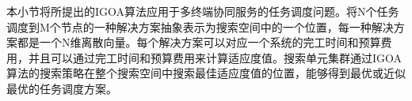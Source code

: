 
本小节将所提出的IGOA算法应用于多终端协同服务的任务调度问题。将N个任务调度到M个节点的一种解决方案抽象表示为搜索空间中的一个位置，每一种解决方案都是一个N维离散向量。每个解决方案可以对应一个系统的完工时间和预算费用，并且可以通过完工时间和预算费用来计算适应度值。搜索单元集群通过IGOA算法的搜索策略在整个搜索空间中搜索最佳适应度值的位置，能够得到最优或近似最优的任务调度方案。

